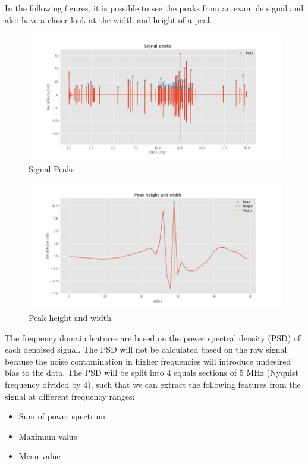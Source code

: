 \documentclass[11pt]{article}
\makeatletter
\def\maxwidth{\ifdim\Gin@nat@width>\linewidth\linewidth
    \else\Gin@nat@width\fi}
\let\Oldincludegraphics\includegraphics
\renewcommand{\includegraphics}[1]{\Oldincludegraphics[width=.8\maxwidth]{#1}}
\providecommand{\tightlist}{%
      \setlength{\itemsep}{0pt}\setlength{\parskip}{0pt}}
\makeatother
\begin{document}
In the following figures, it is possible to see the peaks from an
example signal and also have a closer look at the width and height of a
peak.

\begin{figure}
\centering
\includegraphics{signal_peaks.png}
\caption{Signal Peaks}
\end{figure}

\begin{figure}
\centering
\includegraphics{signal_peak_zoom.png}
\caption{Peak height and width}
\end{figure}

The frequency domain features are based on the power spectral density
(PSD) of each denoised signal. The PSD will not be calculated based on
the raw signal because the noise contamination in higher frequencies
will introduce undesired bias to the data. The PSD will be split into 4
equals sections of 5 MHz (Nyquist frequency divided by 4), such that we
can extract the following features from the signal at different
frequency ranges:

\begin{itemize}
\tightlist
\item
  Sum of power spectrum
\item
  Maximum value
\item
  Mean value
\end{itemize}
\end{document}

